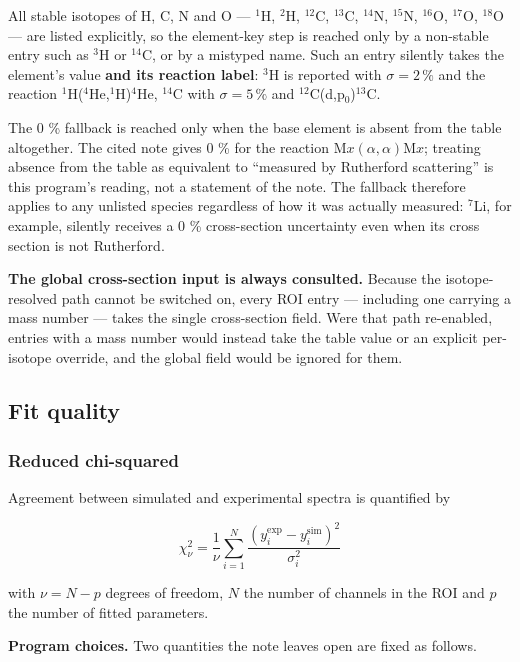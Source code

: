 All stable isotopes of H, C, N and O --- \(^{1}\)H, \(^{2}\)H,
\(^{12}\)C, \(^{13}\)C, \(^{14}\)N, \(^{15}\)N, \(^{16}\)O, \(^{17}\)O,
\(^{18}\)O --- are listed explicitly, so the element-key step is reached
only by a non-stable entry such as \(^{3}\)H or \(^{14}\)C, or by a
mistyped name. Such an entry silently takes the element's value
\textbf{and its reaction label}: \(^{3}\)H is reported with
\(\sigma = 2\,\%\) and the reaction
\(^{1}\)H(\(^{4}\)He,\(^{1}\)H)\(^{4}\)He, \(^{14}\)C with
\(\sigma = 5\,\%\) and \(^{12}\)C(d,p\(_0\))\(^{13}\)C.

The 0 \% fallback is reached only when the base element is absent from
the table altogether. The cited note gives 0 \% for the reaction
\(\mathrm{M}x(\alpha,\alpha)\mathrm{M}x\); treating absence from the
table as equivalent to ``measured by Rutherford scattering'' is this
program's reading, not a statement of the note. The fallback therefore
applies to any unlisted species regardless of how it was actually
measured: \(^{7}\)Li, for example, silently receives a 0 \%
cross-section uncertainty even when its cross section is not Rutherford.

\textbf{The global cross-section input is always consulted.} Because the
isotope-resolved path cannot be switched on, every ROI entry ---
including one carrying a mass number --- takes the single cross-section
field. Were that path re-enabled, entries with a mass number would
instead take the table value or an explicit per-isotope override, and
the global field would be ignored for them.

\subsection{Fit quality}\label{fit-quality}

\subsubsection{Reduced chi-squared}\label{reduced-chi-squared}

Agreement between simulated and experimental spectra is quantified by
\citep[Eq. 5]{diallo2025iba}

\[
\chi^2_\nu = \frac{1}{\nu} \sum_{i=1}^{N} \frac{\left(y_i^{\exp} - y_i^{\mathrm{sim}}\right)^2}{\sigma_i^2} \tag{D5}
\]

with \(\nu = N - p\) degrees of freedom, \(N\) the number of channels in
the ROI and \(p\) the number of fitted parameters.

\textbf{Program choices.} Two quantities the note leaves open are fixed
as follows.


